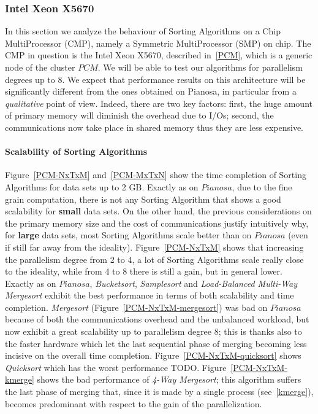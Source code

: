 \subsubsection{Intel Xeon X5670}
In this section we analyze the behaviour of Sorting Algorithms on a Chip MultiProcessor (CMP), namely a Symmetric MultiProcessor (SMP) on chip. The CMP in question is the Intel Xeon X5670, described in~\ref{PCM}, which is a generic node of the cluster $PCM$. We will be able to test our algorithms for parallelism degrees up to 8. We expect that performance results on this architecture will be significantly different from the ones obtained on Pianosa, in particular from a \textit{qualitative} point of view. Indeed, there are two key factors: first, the huge amount of primary memory will diminish the overhead due to I/Os; second, the communications now take place in shared memory thus they are less expensive.

\paragraph{Scalability of Sorting Algorithms} Figure~\ref{PCM-NxTxM} and~\ref{PCM-MxTxN} show the time completion of Sorting Algorithms for data sets up to 2 GB. Exactly as on $Pianosa$, due to the fine grain computation, there is not any Sorting Algorithm that shows a good scalability for \textbf{small} data sets. On the other hand, the previous considerations on the primary memory size and the cost of communications justify intuitively why, for \textbf{large} data sets, most Sorting Algorithms scale better than on $Pianosa$ (even if still far away from the ideality). Figure~\ref{PCM-NxTxM} shows that increasing the parallelism degree from 2 to 4, a lot of Sorting Algorithms scale really close to the ideality, while from 4 to 8 there is still a gain, but in general lower. Exactly as on $Pianosa$, \textit{Bucketsort}, \textit{Samplesort} and \textit{Load-Balanced Multi-Way Mergesort} exhibit the best performance in terms of both scalability and time completion. \textit{Mergesort} (Figure~\ref{PCM-NxTxM-mergesort}) was bad on $Pianosa$ because of both the communications overhead and the unbalanced workload, but now exhibit a great scalability up to parallelism degree 8; this is thanks also to the faster hardware which let the last sequential phase of merging becoming less incisive on the overall time completion. Figure~\ref{PCM-NxTxM-quicksort} shows \textit{Quicksort} which has the worst performance TODO. Figure~\ref{PCM-NxTxM-kmerge} shows the bad performance of \textit{4-Way Mergesort}; this algorithm suffers the last phase of merging that, since it is made by a single process (see~\ref{kmerge}), becomes predominant with respect to the gain of the parallelization. 

